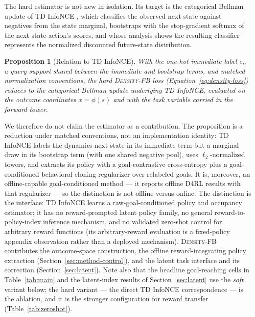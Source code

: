 \documentclass{article}
\newtheorem{proposition}{Proposition}
\newcommand{\DensityFB}{\textsc{Density-FB}}
\begin{document}
The hard estimator is not new in isolation.
Its target is the categorical Bellman update of TD InfoNCE \citep{zheng2024tdinfonce}, which classifies the observed next state against negatives from the state marginal, bootstraps with the stop-gradient softmax of the next state-action's scores, and whose analysis shows the resulting classifier represents the normalized discounted future-state distribution.

\begin{proposition}[Relation to TD InfoNCE]
\label{prop:tdinfonce}
With the one-hot immediate label $e_i$, a query support shared between the immediate and bootstrap terms, and matched normalization conventions, the hard \DensityFB{} loss (Equation~\ref{eq:density-loss}) reduces to the categorical Bellman update underlying TD InfoNCE, evaluated on the outcome coordinates $x=\phi(s)$ and with the task variable carried in the forward tower.
\end{proposition}

We therefore do not claim the estimator as a contribution.
The proposition is a reduction under matched conventions, not an implementation identity: TD InfoNCE labels the dynamics next state in its immediate term but a marginal draw in its bootstrap term (with one shared negative pool), uses $\ell_2$-normalized towers, and extracts its policy with a goal-contrastive cross-entropy plus a goal-conditioned behavioral-cloning regularizer over relabeled goals.
It is, moreover, an offline-capable goal-conditioned method --- it reports offline D4RL results with that regularizer --- so the distinction is not offline versus online.
The distinction is the interface: TD InfoNCE learns a raw-goal-conditioned policy and occupancy estimator; it has no reward-prompted latent policy family, no general reward-to-policy-index inference mechanism, and no validated zero-shot control for arbitrary reward functions (its arbitrary-reward evaluation is a fixed-policy appendix observation rather than a deployed mechanism).
\DensityFB{} contributes the outcome-space construction, the offline reward-integrating policy extraction (Section~\ref{sec:method-control}), and the latent task interface and its correction (Section~\ref{sec:latent}).
Note also that the headline goal-reaching cells in Table~\ref{tab:main} and the latent-index results of Section~\ref{sec:latent} use the \emph{soft} variant below; the hard variant --- the direct TD InfoNCE correspondence --- is the ablation, and it is the stronger configuration for reward transfer (Table~\ref{tab:zeroshot}).
\end{document}
